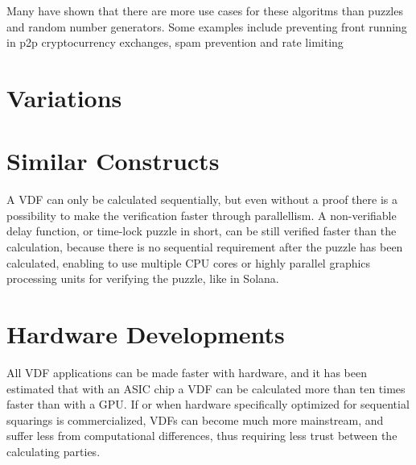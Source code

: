 Many have shown that there are more use cases for these algoritms than puzzles and random number generators. Some examples include preventing front running in p2p cryptocurrency exchanges, spam prevention and rate limiting\cite{noauthor_undated-hk}


\section{Variations}


\section{Similar Constructs}
A VDF can only be calculated sequentially, but even without a proof there is a possibility to make the verification faster through parallellism. A non-verifiable delay function, or time-lock puzzle in short, can be still verified faster than the calculation, because there is no sequential requirement after the puzzle has been calculated, enabling to use multiple CPU cores or highly parallel graphics processing units for verifying the puzzle, like in Solana.\cite{Yakovenko2018-zn} 

\section{Hardware Developments}
All VDF applications can be made faster with hardware, and it has been estimated that with an ASIC chip a VDF can be calculated more than ten times faster than with a GPU. If or when hardware specifically optimized for sequential squarings is commercialized, VDFs can become much more mainstream, and suffer less from computational differences, thus requiring less trust between the calculating parties.
